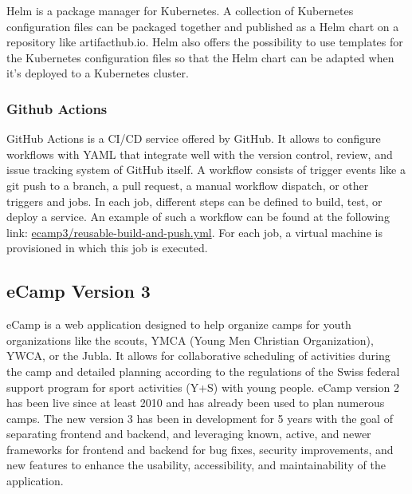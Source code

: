 \documentclass[conference]{IEEEtran}
\begin{document}
Helm is a package manager for Kubernetes\cite{helm-website}.
A collection of Kubernetes configuration files can be packaged together and published as a Helm chart on a repository
like artifacthub.io\cite{artifacthub-io}.
Helm also offers the possibility to use templates for the Kubernetes configuration files so that the Helm chart
can be adapted when it's deployed to a Kubernetes cluster.

\subsubsection{Github Actions}

GitHub Actions is a CI/CD service offered by GitHub\cite{github-actions-website}.
It allows to configure workflows with YAML that integrate well with the version control, review,
and issue tracking system of GitHub itself.
A workflow consists of trigger events like a git push to a branch, a pull request, a manual workflow dispatch, or
other triggers and jobs.
In each job, different steps can be defined to build, test, or deploy a service.
An example of such a workflow can be found at the following link: \href{https://github.com/ecamp/ecamp3/blob/7a1cf92e3eee27b0b942fcd87bd8ce5c221089b7/.github/workflows/reusable-build-and-push.yml}{ecamp3/reusable-build-and-push.yml}.
For each job, a virtual machine is provisioned in which this job is executed\cite{github-actions-about-runner}.

\subsection{eCamp Version 3}

eCamp is a web application designed to help organize camps for youth organizations like the
scouts, YMCA (Young Men Christian Organization)\cite{ymca-website}, YWCA, or the Jubla.
It allows for collaborative scheduling of activities during the camp and detailed planning
according to the regulations of the Swiss federal support program for sport activities (Y+S) with young people\cite{J+S-Website,ecamp3-website}.
eCamp version 2 has been live since at least 2010\cite{ecamp2-first-commit} and has already been used to plan numerous camps.
The new version 3 has been in development for 5 years\cite{ecamp3-website} with the goal of separating frontend and backend,
and leveraging known, active, and newer frameworks for frontend and backend for bug fixes, security improvements,
and new features to enhance the usability, accessibility, and maintainability of the application.
\end{document}
